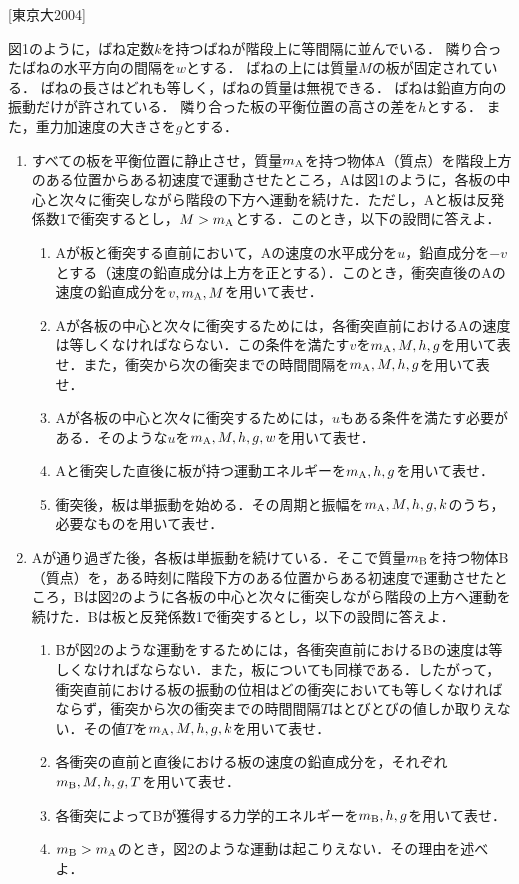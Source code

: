 


\noindent
{} [東京大2004]

図1のように，ばね定数$k$を持つばねが階段上に等間隔に並んでいる．
隣り合ったばねの水平方向の間隔を$w$とする．
ばねの上には質量$M$の板が固定されている．
ばねの長さはどれも等しく，ばねの質量は無視できる．
ばねは鉛直方向の振動だけが許されている．
隣り合った板の平衡位置の高さの差を$h$とする．
また，重力加速度の大きさを$g$とする．

\begin{enumerate}[label=\textbf{問\arabic*}]
  \item {\hzw}すべての板を平衡位置に静止させ，質量$m_\mathrm{A}$を持つ物体A（質点）を階段上方のある位置からある初速度で運動させたところ，Aは図1のように，各板の中心と次々に衝突しながら階段の下方へ運動を続けた．ただし，Aと板は反発係数1で衝突するとし，$M > m_\mathrm{A}$とする．このとき，以下の設問に答えよ．
  \begin{enumerate}[(1)]
    \item {\hzw}Aが板と衝突する直前において，Aの速度の水平成分を$u$，鉛直成分を$-v$とする（速度の鉛直成分は上方を正とする）．このとき，衝突直後のAの速度の鉛直成分を$v, m_\mathrm{A}, M$を用いて表せ．
    \item {\hzw}Aが各板の中心と次々に衝突するためには，各衝突直前におけるAの速度は等しくなければならない．この条件を満たす$v$を$m_\mathrm{A}, M, h, g$を用いて表せ．また，衝突から次の衝突までの時間間隔を$m_\mathrm{A}, M, h, g$を用いて表せ．
    \item {\hzw}Aが各板の中心と次々に衝突するためには，$u$もある条件を満たす必要がある．そのような$u$を$m_\mathrm{A}, M, h, g, w$を用いて表せ．
    \item {\hzw}Aと衝突した直後に板が持つ運動エネルギーを$m_\mathrm{A}, h, g$を用いて表せ．
    \item {\hzw}衝突後，板は単振動を始める．その周期と振幅を$m_\mathrm{A}, M, h, g, k$のうち，必要なものを用いて表せ．
  \end{enumerate}
  \item {\hzw}Aが通り過ぎた後，各板は単振動を続けている．そこで質量$m_\mathrm{B}$を持つ物体B（質点）を，ある時刻に階段下方のある位置からある初速度で運動させたところ，Bは図2のように各板の中心と次々に衝突しながら階段の上方へ運動を続けた．Bは板と反発係数1で衝突するとし，以下の設問に答えよ．
  \begin{enumerate}[(1)]
    \item {\hzw}Bが図2のような運動をするためには，各衝突直前におけるBの速度は等しくなければならない．また，板についても同様である．したがって，衝突直前における板の振動の位相はどの衝突においても等しくなければならず，衝突から次の衝突までの時間間隔$T$はとびとびの値しか取りえない．その値$T$を$m_\mathrm{A}, M, h, g, k$を用いて表せ．
    \item {\hzw}各衝突の直前と直後における板の速度の鉛直成分を，それぞれ$m_\mathrm{B}, M, h, g, T$を用いて表せ．
    \item {\hzw}各衝突によってBが獲得する力学的エネルギーを$m_\mathrm{B}, h, g$を用いて表せ．
    \item {\hzw}$m_\mathrm{B} > m_\mathrm{A}$のとき，図2のような運動は起こりえない．その理由を述べよ．
  \end{enumerate}
\end{enumerate}
